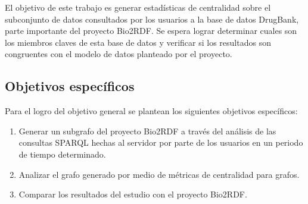 El objetivo de este trabajo es generar estadísticas de centralidad sobre el
subconjunto de datos consultados por los usuarios a la base de datos DrugBank,
parte importante del proyecto Bio2RDF.
Se espera lograr determinar cuales son los miembros claves de esta base de datos
y verificar si los resultados son congruentes con el modelo de datos planteado
por el proyecto.

\subsection{Objetivos específicos}\label{sec:objs:esp}
Para el logro del objetivo general se plantean los siguientes objetivos
específicos:
\begin{enumerate}
  \item
    Generar un subgrafo del proyecto Bio2RDF a través del análisis de las
    consultas SPARQL hechas al servidor por parte de los usuarios en un periodo
    de tiempo determinado.
  \item
    Analizar el grafo generado por medio de métricas de centralidad para grafos.
  \item
    Comparar los resultados del estudio con el proyecto Bio2RDF.
\end{enumerate}
